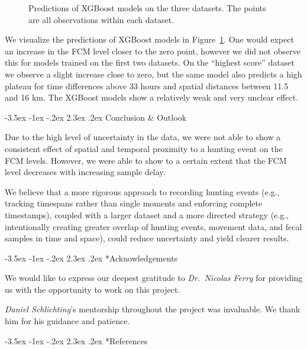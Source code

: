 \documentclass[
  letterpaper,
  DIV=11,
  numbers=noendperiod,
  twocolumn,
  open=any]{scrreprt}
\makeatletter
\renewcommand\chapter{\@startsection{chapter}{0}{\z@}%
  {-3.5ex \@plus -1ex \@minus -.2ex}%
  {2.3ex \@plus.2ex}%
  {\normalfont\Large\bfseries}}
\makeatother
\begin{document}
\begin{figure}
\begin{minipage}{\linewidth}
\end{minipage}%

\caption{\label{fig-xgboost_predictions}Predictions of XGBoost models on
the three datasets. The points are all observations within each
dataset.}

\end{figure}%

We visualize the predictions of XGBoost models in
Figure~\ref{fig-xgboost_predictions}. One would expect an increase in
the FCM level closer to the zero point, however we did not observe this
for models trained on the first two datasets. On the ``highest score''
dataset we observe a slight increase close to zero, but the same model
also predicts a high plateau for time differences above 33 hours and
spatial distances between 11.5 and 16 km. The XGBoost models show a
relatively weak and very unclear effect.

\chapter{Conclusion \& Outlook}\label{sec-outlook}

Due to the high level of uncertainty in the data, we were not able to
show a consistent effect of spatial and temporal proximity to a hunting
event on the FCM levels. However, we were able to show to a certain
extent that the FCM level decreases with increasing sample delay.

We believe that a more rigorous approach to recording hunting events
(e.g., tracking timespans rather than single moments and enforcing
complete timestamps), coupled with a larger dataset and a more directed
strategy (e.g., intentionally creating greater overlap of hunting
events, movement data, and fecal samples in time and space), could
reduce uncertainty and yield clearer results.

\chapter*{Acknowledgements}

We would like to express our deepest gratitude to \emph{Dr.~Nicolas
Ferry} for providing us with the opportunity to work on this project.

\emph{Daniel Schlichting}'s mentorship throughout the project was
invaluable. We thank him for his guidance and patience.

\chapter*{References}
\end{document}
